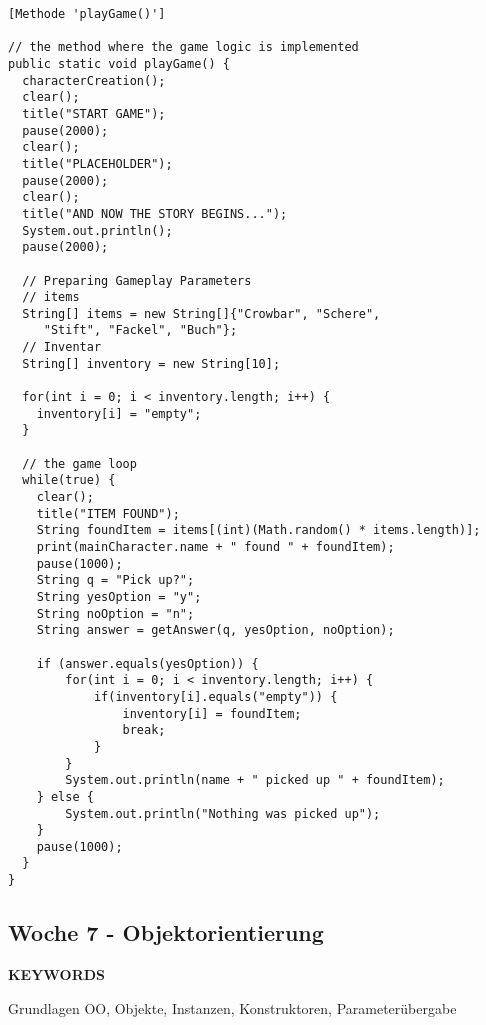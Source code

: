 \begin{verbatim}
[Methode 'playGame()']

// the method where the game logic is implemented
public static void playGame() {
  characterCreation();
  clear();
  title("START GAME");
  pause(2000);
  clear();
  title("PLACEHOLDER");
  pause(2000);
  clear();
  title("AND NOW THE STORY BEGINS...");
  System.out.println();
  pause(2000);
  
  // Preparing Gameplay Parameters
  // items
  String[] items = new String[]{"Crowbar", "Schere",
     "Stift", "Fackel", "Buch"};
  // Inventar
  String[] inventory = new String[10];

  for(int i = 0; i < inventory.length; i++) {
    inventory[i] = "empty";
  }
  
  // the game loop
  while(true) {
    clear();
    title("ITEM FOUND");
    String foundItem = items[(int)(Math.random() * items.length)];
    print(mainCharacter.name + " found " + foundItem);
    pause(1000);
    String q = "Pick up?";
    String yesOption = "y";
    String noOption = "n";
    String answer = getAnswer(q, yesOption, noOption);

    if (answer.equals(yesOption)) {
        for(int i = 0; i < inventory.length; i++) {
            if(inventory[i].equals("empty")) {
                inventory[i] = foundItem;
                break;
            }
        }
        System.out.println(name + " picked up " + foundItem);
    } else {
        System.out.println("Nothing was picked up");
    }
    pause(1000);
  }
}

\end{verbatim}


\subsection{Woche 7 - Objektorientierung}
\label{ch:weekseven}
\line
\begin{center}
	\textbf{KEYWORDS}
	
	Grundlagen OO, Objekte, Instanzen, Konstruktoren, Parameterübergabe
\end{center}
\line